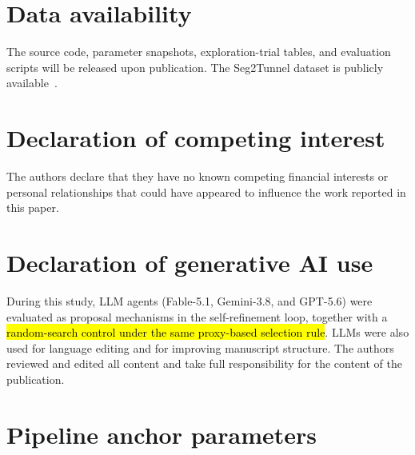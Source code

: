 \documentclass[a4paper,fleqn]{cas-dc}
\begin{document}
{\section*{Data availability}

The source code, parameter snapshots, exploration-trial tables, and evaluation scripts will be released upon publication. The Seg2Tunnel dataset is publicly available~\cite{lin2024seg2tunnel}.

\section*{Declaration of competing interest}

The authors declare that they have no known competing financial interests or personal relationships that could have appeared to influence the work reported in this paper.

\section*{Declaration of generative AI use}

During this study, LLM agents (Fable-5.1, Gemini-3.8, and GPT-5.6) were evaluated as proposal mechanisms in the self-refinement loop, together with a \hl{random-search control under the same proxy-based selection rule}. LLMs were also used for language editing and for improving manuscript structure. The authors reviewed and edited all content and take full responsibility for the content of the publication.







\appendix

\section{Pipeline anchor parameters}\label{app:anchor-parameter}

}
\end{document}
